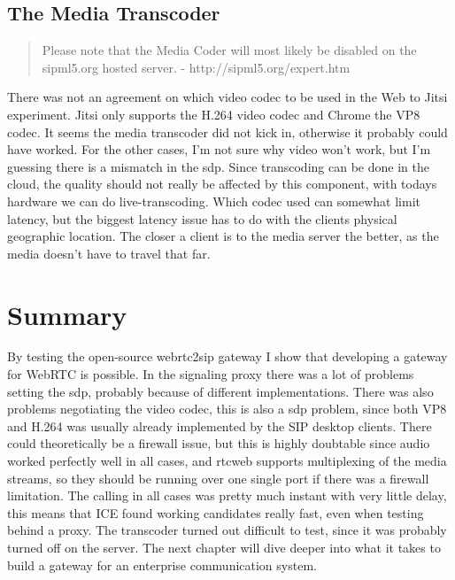 \subsection{The Media Transcoder}
\begin{quote}
Please note that the Media Coder will most likely be disabled on the sipml5.org hosted server. - http://sipml5.org/expert.htm
\end{quote}
There was not an agreement on which video codec to be used in the Web to Jitsi experiment. Jitsi only supports the H.264 video codec and Chrome the VP8 codec. It seems the media transcoder did not kick in, otherwise it probably could have worked. For the other cases, I'm not sure why video won't work, but I'm guessing there is a mismatch in the \gls{sdp}. Since transcoding can be done in the cloud, the quality should not really be affected by this component, with todays hardware we can do live-transcoding. Which codec used can somewhat limit latency, but the biggest latency issue has to do with the clients physical geographic location. The closer a client is to the media server the better, as the media doesn't have to travel that far.

\section{Summary}
By testing the open-source webrtc2sip gateway I show that developing a gateway for WebRTC is possible. In the signaling proxy there was a lot of problems setting the \gls{sdp}, probably because of different implementations. There was also problems negotiating the video codec, this is also a \gls{sdp} problem, since both VP8 and H.264 was usually already implemented by the SIP desktop clients. There could theoretically be a firewall issue, but this is highly doubtable since audio worked perfectly well in all cases, and \gls{rtcweb} supports multiplexing of the media streams, so they should be running over one single port if there was a firewall limitation. The calling in all cases was pretty much instant with very little delay, this means that ICE found working candidates really fast, even when testing behind a proxy. The transcoder turned out difficult to test, since it was probably turned off on the server. The next chapter will dive deeper into what it takes to build a gateway for an enterprise communication system. 




